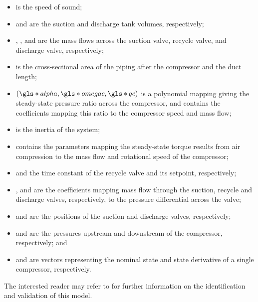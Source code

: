 \begin{itemize}[noitemsep]
  \item {} is the speed of sound;
  \item {} and  are the suction and discharge tank volumes, respectively;
  \item {}, , and  are the mass flows across the suction valve, recycle valve, and discharge valve, respectively;
  \item {} is the cross-sectional area of the piping after the compressor and  the duct length;
  \item {}$\left(\g{alpha},\g{omegac}, \g{qc} \right)$ is a polynomial mapping giving the steady-state pressure ratio across the compressor, and  contains the coefficients mapping this ratio to the compressor speed and mass flow;
  \item {} is the inertia of the system;
  \item {} contains the parameters mapping the steady-state torque results from air compression to the mass flow and rotational speed of the compressor;
  \item {} and  the time constant of the recycle valve and its setpoint, respectively;
  \item {},  and  are the coefficients mapping mass flow through the suction, recycle and discharge valves, respectively, to the pressure differential across the valve;
  \item {} and  are the positions of the suction and discharge valves, respectively;
  \item {} and  are the pressures upstream and downstream of the compressor, respectively; and
  \item {} and  are vectors representing the nominal state and state derivative of a single compressor, respectively.
\end{itemize}

The interested reader may refer to \cite{Cortinovis2015} for further information on the identification and validation of this model.

